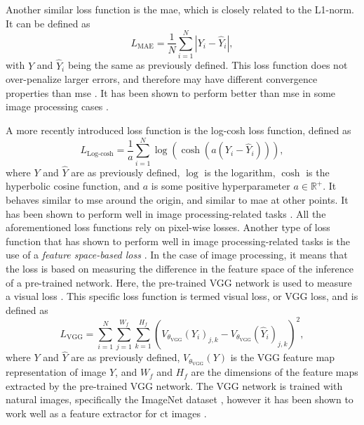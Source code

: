 Another similar loss function is the \gls{mae}, which is closely related to the L1-norm. It can be defined as
\begin{equation}
    \label{eq:lossmae}
    L_{\text{MAE}} = \frac{1}{N} \sum_{i=1}^N |Y_i - \hat{Y}_i|,
\end{equation}
with $Y$ and $\hat{Y}_i$ being the same as previously defined. This loss function does not over-penalize larger errors, and therefore may have different convergence properties than \gls{mse} \cite{7797130}. It has been shown to perform better than \gls{mse} in some image processing cases \cite{7797130,10.1002/mp.13713}. 


A more recently introduced loss function is the log-cosh loss function, defined as \cite{chen2019log}
\begin{equation}
    \label{eq:losslogcosh}
    L_{\text{Log-cosh}} = \frac{1}{a} \sum_{i=1}^N \log ( \cosh ( a ( Y_i - \hat{Y}_i))),
\end{equation}
where $Y$ and $\hat{Y}$ are as previously defined, $\log$ is the logarithm, $\cosh$ is the hyperbolic cosine function, and $a$ is some positive hyperparameter $a \in \mathbb{R}^+$. It behaves similar to \gls{mse} around the origin, and similar to \gls{mae} at other points. It has been shown to perform well in image processing-related tasks \cite{7797130}.
All the aforementioned loss functions rely on pixel-wise losses. Another type of loss function that has shown to perform well in image processing-related tasks is the use of a \textit{feature space-based loss} \cite{vggloss}. In the case of image processing, it means that the loss is based on measuring the difference in the feature space of the inference of a pre-trained network. Here, the pre-trained VGG network is used to measure a visual loss \cite{simonyan2015deep}. This specific loss function is termed visual loss, or VGG loss, and is defined as \cite{vggloss,liu2020tomogan}
\begin{equation}
    \label{eq:lossvgg}
    L_{\text{VGG}} = \sum_{i=1}^{N} \sum_{j=1}^{W_f} \sum_{k=1}^{H_f} \left(V_{\theta_{\text{VGG}}} (Y_i)_{j,k} - V_{\theta_{\text{VGG}}} (\hat{Y}_i)_{j,k} \right)^2,
\end{equation}
where $Y$ and $\hat{Y}$ are as previously defined, $V_{\theta_{\text{VGG}}}(Y)$ is the VGG feature map representation of image $Y$, and $W_f$ and $H_f$ are the dimensions of the feature maps extracted by the pre-trained VGG network. The VGG network is trained with natural images, specifically the ImageNet dataset \cite{deng2009imagenet}, however it has been shown to work well as a feature extractor for \gls{ct} images \cite{8340157}. 

